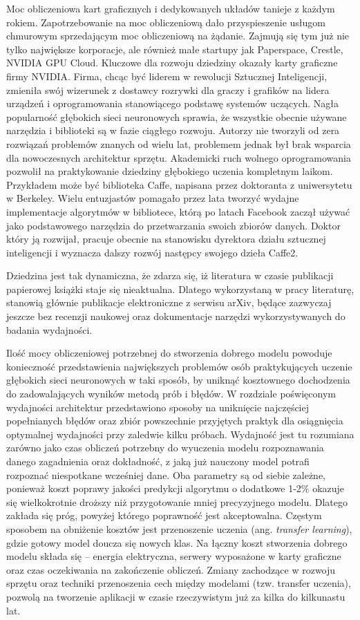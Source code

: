 \documentclass[12pt,a4paper,twoside,titlepage,openright]{book}
\begin{document}
Moc obliczeniowa kart graficznych i dedykowanych układów tanieje z każdym rokiem. Zapotrzebowanie na moc obliczeniową dało przyspieszenie usługom chmurowym sprzedającym moc obliczeniową na żądanie. Zajmują się tym już nie tylko największe korporacje, ale również małe startupy jak Paperspace, Crestle, NVIDIA GPU Cloud. Kluczowe dla rozwoju dziedziny okazały karty graficzne firmy NVIDIA. Firma, chcąc być liderem w rewolucji Sztucznej Inteligencji, zmieniła swój wizerunek z dostawcy rozrywki dla graczy i grafików na lidera urządzeń i oprogramowania stanowiącego podstawę systemów uczących. Nagła popularność głębokich sieci neuronowych sprawia, że wszystkie obecnie używane narzędzia i biblioteki są w fazie ciągłego rozwoju. Autorzy nie tworzyli od zera rozwiązań problemów znanych od wielu lat, problemem jednak był brak wsparcia dla nowoczesnych architektur sprzętu. Akademicki ruch wolnego oprogramowania pozwolił na praktykowanie dziedziny głębokiego uczenia kompletnym laikom. Przykładem może być biblioteka Caffe, napisana przez doktoranta z uniwersytetu w Berkeley. Wielu entuzjastów pomagało przez lata tworzyć wydajne implementacje algorytmów w bibliotece, którą po latach Facebook zaczął używać jako podstawowego narzędzia do przetwarzania swoich zbiorów danych. Doktor który ją rozwijał, pracuje obecnie na stanowisku dyrektora działu sztucznej inteligencji i wyznacza dalszy rozwój następcy swojego dzieła Caffe2. \cite{siteJia}

Dziedzina jest tak dynamiczna, że zdarza się, iż literatura w czasie publikacji papierowej książki staje się nieaktualna. Dlatego wykorzystaną w pracy literaturę, stanowią głównie publikacje elektroniczne z serwisu arXiv, będące zazwyczaj jeszcze bez recenzji naukowej oraz dokumentacje narzędzi wykorzystywanych do badania wydajności. 

Ilość mocy obliczeniowej potrzebnej do stworzenia dobrego modelu powoduje konieczność przedstawienia największych problemów osób praktykujących uczenie głębokich sieci neuronowych w taki sposób, by uniknąć kosztownego dochodzenia do zadowalających wyników metodą prób i błędów. W rozdziale poświęconym wydajności architektur przedstawiono sposoby na uniknięcie najczęściej popełnianych błędów oraz zbiór powszechnie przyjętych praktyk dla osiągnięcia optymalnej wydajności przy zaledwie kilku próbach. Wydajność jest tu rozumiana zarówno jako czas obliczeń potrzebny do wyuczenia modelu rozpoznawania danego zagadnienia oraz dokładność, z jaką już nauczony model potrafi rozpoznać niespotkane wcześniej dane. Oba parametry są od siebie zależne, ponieważ koszt poprawy jakości predykcji algorytmu o dodatkowe 1-2\% okazuje się wielkokrotnie droższy niż przygotowanie mniej precyzyjnego modelu. Dlatego zakłada się próg, powyżej którego poprawność jest akceptowalna. Częstym sposobem na obniżenie kosztów jest przenoszenie uczenia (ang. \textit{transfer learning}), gdzie gotowy model doucza się nowych klas. 
Na łączny koszt stworzenia dobrego modelu składa się -- energia elektryczna, serwery wyposażone w karty graficzne oraz czas oczekiwania na zakończenie obliczeń. Zmiany zachodzące w rozwoju sprzętu oraz techniki przenoszenia cech między modelami (tzw. transfer uczenia), pozwolą na tworzenie aplikacji w czasie rzeczywistym już za kilka do kilkunastu lat.
\end{document}
